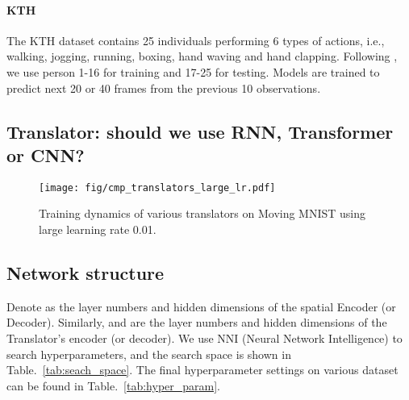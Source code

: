 \documentclass[10pt,twocolumn,letterpaper]{article}
\begin{document}
\paragraph{KTH} The KTH dataset \cite{schuldt2004recognizing} contains 25 individuals performing 6 types of actions, i.e., walking, jogging, running, boxing, hand waving and hand clapping. Following \cite{villegas2017decomposing,wang2018eidetic}, we use person 1-16 for training and 17-25 for testing. Models are trained to predict next 20 or 40 frames from the previous 10 observations.

\subsection{Translator: should we use RNN, Transformer or CNN?}

  \begin{figure}[h]
    \centering
        \texttt{[image: fig/cmp\_translators\_large\_lr.pdf]}
      \caption{ Training dynamics of various translators on Moving MNIST using large learning rate 0.01.}
      \label{fig:cmp_translators_lr}
  \end{figure}

\subsection{Network structure}
Denote  as the layer numbers and hidden dimensions of the spatial Encoder (or Decoder). Similarly,  and  are the layer numbers and hidden dimensions of the Translator's encoder (or decoder). We use NNI (Neural Network Intelligence) to search hyperparameters, and the search space is shown in Table.~\ref{tab:seach_space}.  The final hyperparameter settings on various dataset can be found in Table.~\ref{tab:hyper_param}.

\begin{table}[h]
  \centering
  \caption{Search space}
  \label{tab:seach_space}
\end{table}
\end{document}
